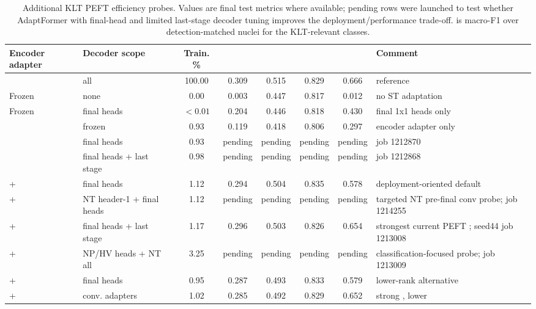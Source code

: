 \begin{table}
\caption{Additional KLT PEFT efficiency probes. Values are final test metrics where available; pending rows were launched to test whether AdaptFormer with final-head and limited last-stage decoder tuning improves the deployment/performance trade-off. \Ftype{} is macro-F1 over detection-matched nuclei for the KLT-relevant classes.}
\label{tab:klt_adapter_efficiency_extra}
\centering
\footnotesize
\setlength{\tabcolsep}{2.5pt}
\begin{tabular}{llccccc l}
\toprule
Encoder adapter & Decoder scope & Train. \% & \mPQ{} & \bPQ{} & \Fdet{} & \Ftype{} & Comment \\
\midrule
\FullFT{} & all & 100.00 & 0.309 & 0.515 & 0.829 & 0.666 & reference \\
Frozen & none & 0.00 & 0.003 & 0.447 & 0.817 & 0.012 & no ST adaptation \\
Frozen & final heads & $<0.01$ & 0.204 & 0.446 & 0.818 & 0.430 & final 1x1 heads only \\
\AF{} & frozen & 0.93 & 0.119 & 0.418 & 0.806 & 0.297 & encoder adapter only \\
\AF{} & final heads & 0.93 & pending & pending & pending & pending & job 1212870 \\
\AF{} & final heads + last stage & 0.98 & pending & pending & pending & pending & job 1212868 \\
\LoRA{}+\AF{} & final heads & 1.12 & 0.294 & 0.504 & 0.835 & 0.578 & deployment-oriented default \\
\LoRA{}+\AF{} & NT header-1 + final heads & 1.12 & pending & pending & pending & pending & targeted NT pre-final conv probe; job 1214255 \\
\LoRA{}+\AF{} & final heads + last stage & 1.17 & 0.296 & 0.503 & 0.826 & 0.654 & strongest current PEFT \Ftype{}; seed44 job 1213008 \\
\LoRA{}+\AF{} & NP/HV heads + NT all & 3.25 & pending & pending & pending & pending & classification-focused probe; job 1213009 \\
\VeRA{}+\AF{} & final heads & 0.95 & 0.287 & 0.493 & 0.833 & 0.579 & lower-rank alternative \\
\VeRA{}+\AF{} & conv. adapters & 1.02 & 0.285 & 0.492 & 0.829 & 0.652 & strong \Ftype{}, lower \mPQ{} \\
\bottomrule
\end{tabular}
\end{table}
